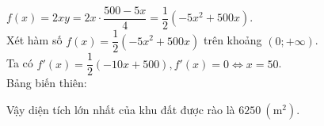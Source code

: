 \begin{ex}
{$f(x)=2xy=2x\cdot \dfrac{500 - 5x}{4}= \dfrac{1}{2}\left(-5x^2 + 500x\right)$.\\
Xét hàm số $f(x)=\dfrac{1}{2}\left(-5x^2+500x\right)$ trên khoảng $(0;+\infty)$.\\
Ta có $f'(x)=\dfrac{1}{2}\left(-10x + 500\right), f'(x) = 0 \Leftrightarrow x = 50$.\\
Bảng biến thiên:
\begin{center}
\end{center}
Vậy diện tích lớn nhất của khu đất được rào là $6250 \ (\mathrm{m}^2)$.
}
\end{ex}


